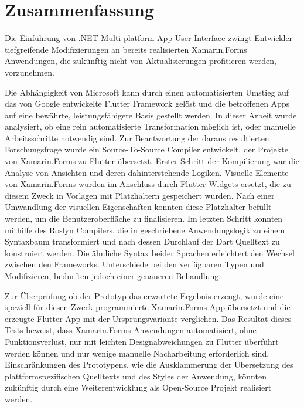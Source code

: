 
\chapter*{Zusammenfassung}
Die Einführung von .NET Multi-platform App User Interface zwingt Entwickler tiefgreifende 
Modifizierungen an bereits realisierten Xamarin.Forms Anwendungen, die zukünftig 
nicht von Aktualisierungen profitieren werden, vorzunehmen.

Die Abhängigkeit von Microsoft kann durch einen automatisierten Umstieg auf das
von Google entwickelte Flutter Framework gelöst und die betroffenen Apps auf eine
bewährte, leistungsfähigere Basis gestellt werden. In dieser Arbeit wurde analysiert,
ob eine rein automatisierte Transformation möglich ist, oder manuelle Arbeitsschritte notwendig 
sind. Zur Beantwortung der daraus resultierten Forschungsfrage wurde ein Source-To-Source 
Compiler entwickelt, der Projekte von Xamarin.Forms zu Flutter übersetzt.
Erster Schritt der Kompilierung war die Analyse von Ansichten und deren dahinterstehende Logiken. 
Visuelle Elemente von Xamarin.Forms wurden im Anschluss durch Flutter Widgets ersetzt, die zu 
diesem Zweck in Vorlagen mit Platzhaltern gespeichert wurden. Nach einer Umwandlung
der visuellen Eigenschaften konnten diese Platzhalter befüllt werden, um die Benutzeroberfläche zu 
finalisieren.
Im letzten Schritt konnten mithilfe des Roslyn Compilers, die in \Csharp{} geschriebene Anwendungslogik zu 
einem Syntaxbaum transformiert und nach dessen Durchlauf der Dart Quelltext zu konstruiert 
werden. Die ähnliche Syntax beider Sprachen erleichtert den Wechsel zwischen den Frameworks.  Unterschiede bei den 
verfügbaren Typen und Modifizieren, bedurften jedoch einer genaueren Behandlung.


Zur Überprüfung ob der Prototyp das erwartete Ergebnis erzeugt, wurde eine speziell
für diesen Zweck programmierte Xamarin.Forms App übersetzt und die erzeugte Flutter
App mit der Ursprungsvariante verglichen. Das Resultat dieses Tests beweist, dass
Xamarin.Forms Anwendungen automatisiert, ohne Funktionsverlust, nur mit leichten
Designabweichungen zu Flutter überführt werden können und nur wenige manuelle
Nacharbeitung erforderlich sind. Einschränkungen des Prototypens, wie die Ausklammerung der 
Übersetzung des plattformspezifischen Quelltexts und des Styles der Anwendung, könnten 
zukünftig durch eine Weiterentwicklung als Open-Source Projekt
realisiert werden.


